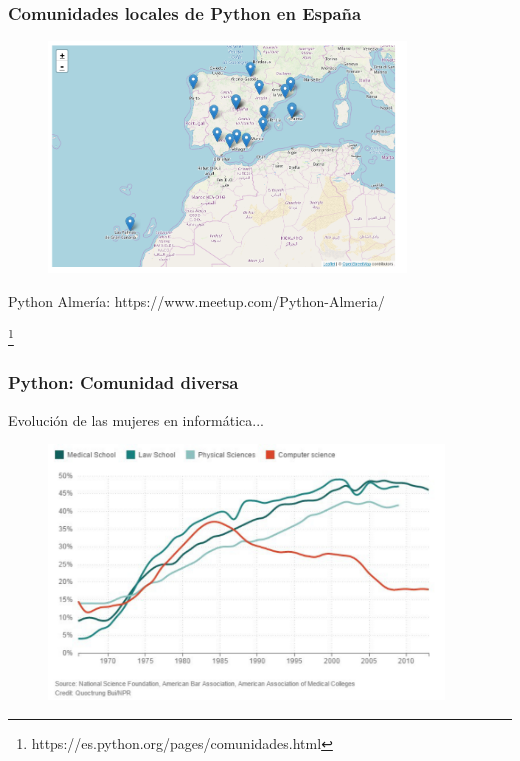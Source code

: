 \documentclass[18pt]{beamer}
\newcommand\blfootnote[1]{%
  \begingroup
  \renewcommand\thefootnote{}\footnote{#1}%
  \addtocounter{footnote}{-1}%
  \endgroup
}
\begin{document}
\begin{frame}

	\frametitle{Comunidades locales de Python en España}
	
	\begin{figure}
		\includegraphics[width=9.5cm]{images/comunidades_locales.png}
	\end{figure}

	\centerline{Python Almería: https://www.meetup.com/Python-Almeria/}		
	
	\blfootnote{\scriptsize https://es.python.org/pages/comunidades.html}
	
\end{frame}


\begin{frame}

	\frametitle{Python: Comunidad diversa}
	
	Evolución de las mujeres en informática...
	
	\begin{figure}
		\includegraphics[width=10.5cm]{images/women_computer_science.png}
	\end{figure}
		
\end{frame}
\end{document}
